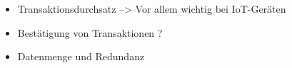 

\begin{itemize}
    \item Transaktionsdurchsatz --> Vor allem wichtig bei IoT-Geräten
    \item Bestätigung von Transaktionen ?
    \item Datenmenge und Redundanz
\end{itemize}

\label{subsec:eval-konsens}
